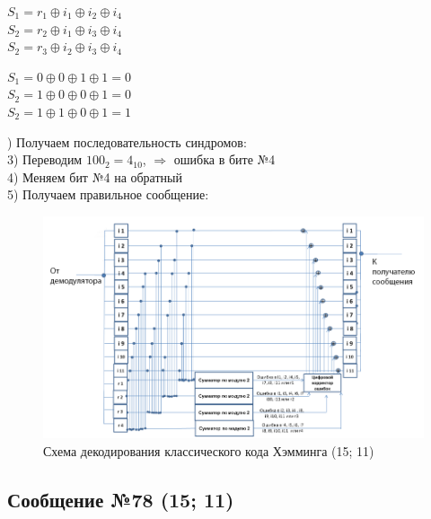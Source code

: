 \documentclass[12pt]{article}
\begin{document}
\begin{multicols}{2}


    $S_1 = r_1 \oplus i_1 \oplus i_2 \oplus i_4$\\
    $S_2 = r_2 \oplus i_1 \oplus i_3 \oplus i_4$\\
    $S_2 = r_3 \oplus i_2 \oplus i_3 \oplus i_4$\\

    \columnbreak

    $S_1 = 0 \oplus 0 \oplus 1 \oplus 1 = 0$\\
    $S_2 = 1 \oplus 0 \oplus 0 \oplus 1 = 0$\\
    $S_2 = 1 \oplus 1 \oplus 0 \oplus 1 = 1$\\

\end{multicols}

) Получаем последовательность синдромов: \\
3) Переводим $100_2 = 4_{10}$, $\Rightarrow$ ошибка в бите №4\\
4) Меняем бит №4 на обратный\\
5) Получаем правильное сообщение: 

\newpage

\begin{figure}[h]
    \includegraphics[width=\linewidth]{img/image2.png}
    \caption{Схема декодирования классического кода Хэмминга (15; 11)}
\end{figure}

\subsection{Сообщение №78 (15; 11)}
\end{document}
